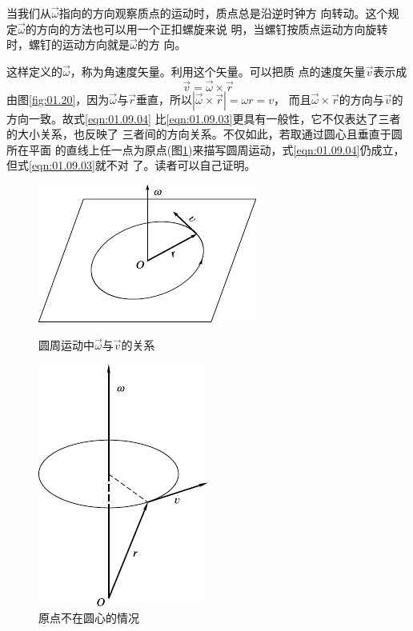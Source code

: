 \noindent 当我们从$ \vec{\omega}$指向的方向观察质点的运动时，质点总是沿逆时钟方
向转动。这个规定$ \vec{\omega}$的方向的方法也可以用一个正扣螺旋来说
明，当螺钉按质点运动方向旋转时，螺钉的运动方向就是$ \vec{\omega}$的方
向。

这样定义的$ \vec{\omega}$，称为角速度矢量。利用这个矢量。可以把质
点的速度矢量$\vec{v}$表示成
\begin{equation}\label{eqn:01.09.04}
  \vec{v}= \vec{\omega}\times \vec{r}
\end{equation}
由图\ref{fig:01.20}，因为$ \vec{\omega}$与$\vec{r}$垂直，所以$| \vec{\omega}\times\vec{r}|=\omega r=v$，
而且$ \vec{\omega}\times\vec{r}$的方向与$\vec{v}$的方向一致。故式\eqref{eqn:01.09.04}
比\eqref{eqn:01.09.03}更具有一般性，它不仅表达了三者的大小关系，也反映了
三者间的方向关系。不仅如此，若取通过圆心且垂直于圆所在平面
的直线上任一点为原点(图\ref{fig:01.21})来描写圆周运动，式\eqref{eqn:01.09.04}仍成立，但式\eqref{eqn:01.09.03}就不对
\clearpage
\noindent 了。读者可以自己证明。

\begin{figure}[!h]
  \small
  \begin{minipage}[b]{15em}
    \centering
    \includegraphics{figure/fig01.20}
    \vspace{4em}
    \caption{圆周运动中$ \vec{\omega}$与$\vec{v}$的关系}
    \label{fig:01.20}
  \end{minipage}
  \hfill
  \begin{minipage}[b]{13em}
    \centering
    \includegraphics{figure/fig01.21}
    \caption{原点不在圆心的情况}
    \label{fig:01.21}
  \end{minipage}
\end{figure}

